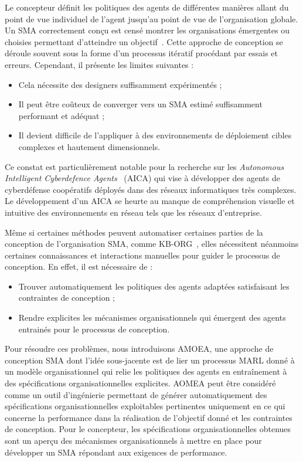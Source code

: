 \documentclass[contribution]{jfsma}
\begin{document}
Le concepteur définit les politiques des agents de différentes manières allant du point de vue individuel de l'agent jusqu'au point de vue de l'organisation globale. Un SMA correctement conçu est censé montrer les organisations émergentes ou choisies permettant d'atteindre un objectif~\cite{Picard2009}. Cette approche de conception se déroule souvent sous la forme d’un processus itératif procédant par essais et erreurs. Cependant, il présente les limites suivantes :

\begin{itemize}
  \item Cela nécessite des designers suffisamment expérimentés ;
  \item Il peut être coûteux de converger vers un SMA estimé suffisamment performant et adéquat ; 
  \item Il devient difficile de l'appliquer à des environnements de déploiement cibles complexes et hautement dimensionnels.
\end{itemize}

Ce constat est particulièrement notable pour la recherche sur les \emph{Autonomous Intelligent Cyberdefence Agents}~\cite{Kott2023} (AICA) qui vise à développer des agents de cyberdéfense coopératifs déployés dans des réseaux informatiques très complexes. Le développement d'un AICA se heurte au manque de compréhension visuelle et intuitive des environnements en réseau tels que les réseaux d'entreprise.


Même si certaines méthodes peuvent automatiser certaines parties de la conception de l'organisation SMA, comme KB-ORG~\cite{Sims2008}, elles nécessitent néanmoins certaines connaissances et interactions manuelles pour guider le processus de conception. En effet, il est nécessaire de :

\begin{itemize}
  \item Trouver automatiquement les politiques des agents adaptées satisfaisant les contraintes de conception ; 
  \item Rendre explicites les mécanismes organisationnels qui émergent des agents entrainés pour le processus de conception.
\end{itemize}


Pour résoudre ces problèmes, nous introduisons AMOEA, une approche de conception SMA dont l'idée sous-jacente est de lier un processus MARL donné à un modèle organisationnel qui relie les politiques des agents en entraînement à des spécifications organisationnelles explicites. AOMEA peut être considéré comme un outil d'ingénierie permettant de générer automatiquement des spécifications organisationnelles exploitables pertinentes uniquement en ce qui concerne la performance dans la réalisation de l'objectif donné et les contraintes de conception. Pour le concepteur, les spécifications organisationnelles obtenues sont un aperçu des mécanismes organisationnels à mettre en place pour développer un SMA répondant aux exigences de performance.
\end{document}
